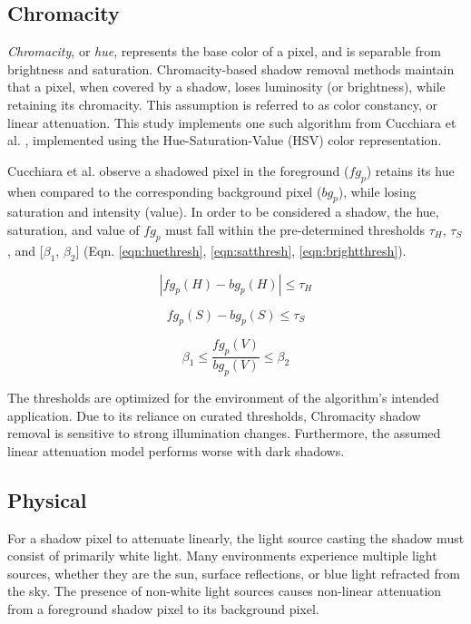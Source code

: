 \subsection{Chromacity}

\textit{Chromacity}, or \textit{hue}, represents the base color of a pixel, and is separable from brightness and saturation. Chromacity-based shadow removal methods maintain that a pixel, when covered by a shadow, loses luminosity (or brightness), while retaining its chromacity. This assumption is referred to as  color constancy, or linear attenuation. This study implements one such algorithm from Cucchiara et al. \cite{cucchiara2003detecting}, implemented using the Hue-Saturation-Value (HSV) color representation. 

Cucchiara et al. observe a shadowed pixel in the foreground ($fg_{p}$) retains its hue when compared to the corresponding background pixel ($bg_{p}$), while losing saturation and intensity (value). In order to be considered a shadow, the hue, saturation, and value of $fg_{p}$ must fall within the pre-determined thresholds $\tau_{H}$, $\tau_{S}$, and [$\beta_{1}$, $\beta_{2}$] (Eqn. \ref{eqn:huethresh}, \ref{eqn:satthresh}, \ref{eqn:brightthresh}).

\begin{equation} \label{eqn:huethresh}
| fg_{p}(H) - bg_{p}(H) | \leq \tau_{H}
\end{equation}

\begin{equation} \label{eqn:satthresh}
fg_{p}(S) - bg_{p}(S) \leq \tau_{S}
\end{equation}

\begin{equation} \label{eqn:brightthresh}
\beta_{1} \leq \dfrac{fg_{p}(V)}{bg_{p}(V)} \leq \beta_{2}
\end{equation}

The thresholds are optimized for the environment of the algorithm's intended application. Due to its reliance on curated thresholds, Chromacity shadow removal is sensitive to strong illumination changes. Furthermore, the assumed linear attenuation model performs worse with dark shadows. 

\subsection{Physical}

For a shadow pixel to attenuate linearly, the light source casting the shadow must consist of primarily white light. Many environments experience multiple light sources, whether they are the sun, surface reflections, or blue light refracted from the sky. The presence of non-white light sources causes non-linear attenuation from a foreground shadow pixel to its background pixel.

